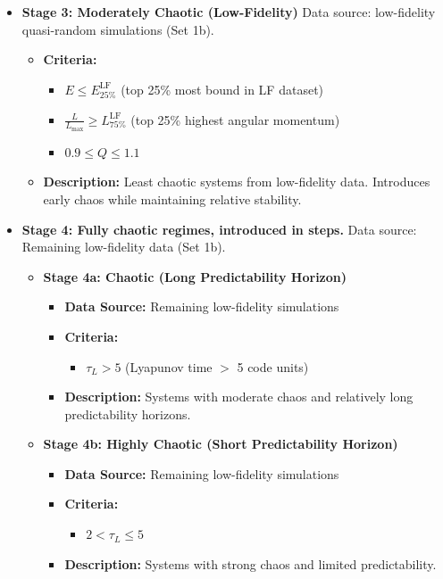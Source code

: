 \begin{itemize}
    
    \item \textbf{Stage 3: Moderately Chaotic (Low-Fidelity)}  Data source: low-fidelity quasi-random simulations (Set 1b).
    \begin{itemize}
        \item \textbf{Criteria:}
        \begin{itemize}
            \item $E \leq E^{\mathrm{LF}}_{25\%}$ \hspace{0.5em} (top 25\% most bound in LF dataset)
            \item $\frac{L}{L_{\max}} \geq L^{\mathrm{LF}}_{75\%}$ \hspace{0.5em} (top 25\% highest angular momentum)
            \item $0.9 \leq Q \leq 1.1$
        \end{itemize}
        \item \textbf{Description:} Least chaotic systems from low-fidelity data. Introduces early chaos while maintaining relative stability.
    \end{itemize}
    
    
    \item \textbf{Stage 4: Fully chaotic regimes, introduced in steps.} 
    Data source: Remaining low-fidelity data (Set 1b).  

    
    \begin{itemize}
        \item \textbf{Stage 4a: Chaotic (Long Predictability Horizon)}
        \begin{itemize}
            \item \textbf{Data Source:} Remaining low-fidelity simulations
            \item \textbf{Criteria:}
            \begin{itemize}
                \item $\tau_L > 5$ \hspace{0.5em} (Lyapunov time $>$ 5 code units)
            \end{itemize}
            \item \textbf{Description:} Systems with moderate chaos and relatively long predictability horizons.
        \end{itemize}
        
        \item \textbf{Stage 4b: Highly Chaotic (Short Predictability Horizon)}
        \begin{itemize}
            \item \textbf{Data Source:} Remaining low-fidelity simulations
            \item \textbf{Criteria:}
            \begin{itemize}
                \item $2 < \tau_L \leq 5$
            \end{itemize}
            \item \textbf{Description:} Systems with strong chaos and limited predictability.
        \end{itemize}
    \end{itemize}



\end{itemize}
